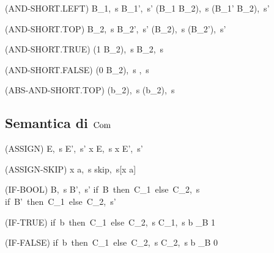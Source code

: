 \begin{center}
	(AND-SHORT.LEFT)
	\prooftree
		\langle B_1,\ s \rangle \rightarrow \langle B_1',\ s' \rangle
		\justifies
		\langle (B_1 \land B_2),\ s \rangle \rightarrow \langle (B_1' \land B_2),\ s' \rangle
	\endprooftree
\end{center}

\begin{center}
	(AND-SHORT.TOP)
	\prooftree
		\langle B_2,\ s \rangle \rightarrow \langle B_2',\ s' \rangle
		\justifies
		\langle (\top \land B_2),\ s \rangle \rightarrow \langle (\top \land B_2'),\ s' \rangle
	\endprooftree
\end{center}

\begin{center}
	(AND-SHORT.TRUE)
	\prooftree
		\justifies
		\langle (1 \land B_2),\ s \rangle \rightarrow \langle B_2,\ s \rangle
	\endprooftree
\end{center}

\begin{center}
	(AND-SHORT.FALSE)
	\prooftree
		\justifies
		\langle (0 \land B_2),\ s \rangle \rightarrow {},\ s \rangle
	\endprooftree
\end{center}

\begin{center}
	(ABS-AND-SHORT.TOP)
	\prooftree
		\justifies
		\langle (\top \land b_2),\ s \rangle \rightarrow \langle (\top \absand b_2),\ s \rangle
	\endprooftree
\end{center}

\subsection{Semantica di $\mathrm{Com}$}

\begin{center}
	(ASSIGN)
	\prooftree
		\langle E,\ s \rangle \rightarrow \langle E',\ s' \rangle
		\justifies
		\langle x \weq E,\ s \rangle \rightarrow \langle x \weq E',\ s' \rangle
	\endprooftree
\end{center}

\begin{center}
	(ASSIGN-SKIP)
	\prooftree
		\justifies
		\langle x \weq a,\ s \rangle \rightarrow \langle skip,\ s[x \mapsto a] \rangle
	\endprooftree
\end{center}

\begin{center}
	(IF-BOOL)
	\prooftree
		\langle B,\ s \rangle \rightarrow \langle B',\ s' \rangle
		\justifies
		\langle if\ B\ then\ C_1\ else\ C_2,\ s \rangle \rightarrow \langle if\ B'\ then\ C_1\ else\ C_2,\ s' \rangle
	\endprooftree
\end{center}

\begin{center}
	(IF-TRUE)
	\prooftree
		\justifies
		\langle if\ b\ then\ C_1\ else\ C_2,\ s \rangle \rightarrow \langle C_1,\ s \rangle
		\using b \sqsubseteq_B 1
	\endprooftree
\end{center}

\begin{center}
	(IF-FALSE)
	\prooftree
		\justifies
		\langle if\ b\ then\ C_1\ else\ C_2,\ s \rangle \rightarrow \langle C_2,\ s \rangle
		\using b \sqsubseteq_B 0
	\endprooftree
\end{center}
